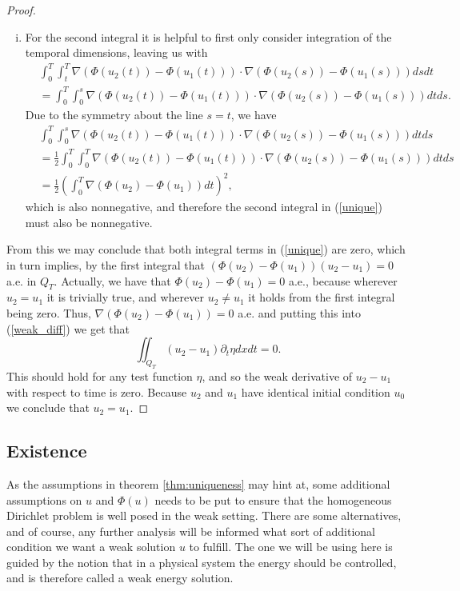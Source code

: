 \documentclass[11pt, a4paper]{article}
\begin{document}
\begin{proof}
\begin{enumerate}[i)]
	\item For the second integral it is helpful to first only consider integration of the temporal dimensions, leaving us with
	\begin{align*}
	&\int_0^T\int_t^T \nabla(\Phi(u_2(t)) - \Phi(u_1(t)))\cdot \nabla(\Phi(u_2(s))-\Phi(u_1(s)))dsdt \\
	&= \int_0^T\int_0^s\nabla(\Phi(u_2(t)) - \Phi(u_1(t)))\cdot \nabla(\Phi(u_2(s))-\Phi(u_1(s)))dtds.
	\end{align*}
	Due to the symmetry about the line $s=t$, we have
	\begin{align*}
	&\int_0^T\int_0^s\nabla(\Phi(u_2(t)) - \Phi(u_1(t)))\cdot \nabla(\Phi(u_2(s))-\Phi(u_1(s)))dtds \\
	&= \frac{1}{2}\int_0^T \int_0^T \nabla(\Phi(u_2(t)) - \Phi(u_1(t)))\cdot \nabla(\Phi(u_2(s))-\Phi(u_1(s)))dtds \\
	&= \frac{1}{2}\left( \int_0^T \nabla(\Phi(u_2)-\Phi(u_1))dt\right)^2,
	\end{align*}
	which is also nonnegative, and therefore the second integral in (\ref{unique}) must also be nonnegative.
\end{enumerate}
From this we may conclude that both integral terms in (\ref{unique}) are zero, which in turn implies, by the first integral that $(\Phi(u_2)-\Phi(u_1))(u_2 - u_1) = 0$ a.e. in $Q_T$. Actually, we have that $\Phi(u_2) - \Phi(u_1) = 0$ a.e., because wherever $u_2 = u_1$ it is trivially true, and wherever $ u_2 \neq u_1$ it holds from the first integral being zero. Thus, $ \nabla (\Phi(u_2) - \Phi(u_1) ) = 0$ a.e. and putting this into (\ref{weak_diff}) we get that
\begin{equation*}
\iint_{Q_T}(u_2 - u_1)\partial_t \eta dx dt = 0.
\end{equation*}
This should hold for any test function $\eta$, and so the weak derivative of $u_2 - u_1$ with respect to time is zero. Because $u_2$ and $u_1$ have identical initial condition $u_0$ we conclude that $u_2 = u_1$.
\end{proof}

\subsection{Existence}
As the assumptions in theorem \ref{thm:uniqueness} may hint at, some additional assumptions on $u$ and $\Phi(u)$ needs to be put to ensure that the homogeneous Dirichlet problem is well posed in the weak setting. There are some alternatives, and of course, any further analysis will be informed what sort of additional condition we want a weak solution $u$ to fulfill. The one we will be using here is guided by the notion that in a physical system the energy should be controlled, and is therefore called a weak energy solution. 
\end{document}
